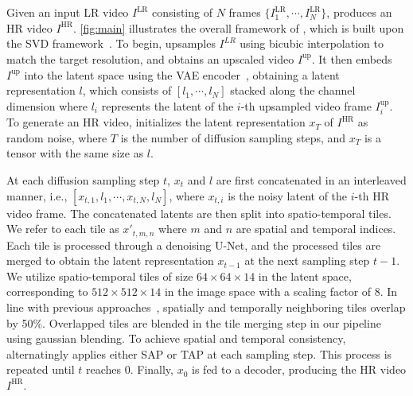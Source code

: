 \section{\ours{}}
\label{sec:method}
Given an input LR video $I^\textrm{LR}$ consisting of $N$ frames $\{I^\textrm{LR}_1, \cdots, I^\textrm{LR}_N\}$, \ours{} produces an HR video $I^\textrm{HR}$.
\cref{fig:main} illustrates the overall framework of \ours{}, which is built upon the SVD framework~\cite{svd}.
To begin, \ours{} upsamples $I^{LR}$ using bicubic interpolation to match the target resolution, and obtains an upscaled video $I^\textrm{up}$.
It then embeds $I^\textrm{up}$ into the latent space using the VAE encoder~\cite{ldm}, obtaining a latent representation $l$, which consists of $[l_1, \cdots, l_N]$ stacked along the channel dimension where $l_i$ represents the latent of the $i$-th upsampled video frame $I^\textrm{up}_i$.
To generate an HR video, \ours{} initializes the latent representation $x_T$ of $I^\textrm{HR}$ as random noise, where $T$ is the number of diffusion sampling steps, and $x_T$ is a tensor with the same size as $l$.

At each diffusion sampling step $t$,
$x_t$ and $l$ are first concatenated in an interleaved manner, i.e., $[x_{t,1}, l_1, \cdots, x_{t,N}, l_N]$, where $x_{t,i}$ is the noisy latent of the $i$-th HR video frame.
The concatenated latents are then split into spatio-temporal tiles.
We refer to each tile as $x'_{t,m,n}$ where $m$ and $n$ are spatial and temporal indices.
Each tile is processed through a denoising U-Net, and the processed tiles are merged to obtain the latent representation $x_{t-1}$ at the next sampling step $t-1$.
We utilize spatio-temporal tiles of size $64\times64\times14$ in the latent space, corresponding to $512\times512\times14$ in the image space with a scaling factor of 8. In line with previous approaches~\cite{zhou2024upscaleavideo, yang2023mgldvsr}, spatially and temporally neighboring tiles overlap by 50\%.
Overlapped tiles are blended in the tile merging step in our pipeline using gaussian blending.
To achieve spatial and temporal consistency, \ours{} alternatingly applies either SAP or TAP at each sampling step.
This process is repeated until $t$ reaches $0$.
Finally, $x_0$ is fed to a decoder, producing the HR video $I^\textrm{HR}$.

